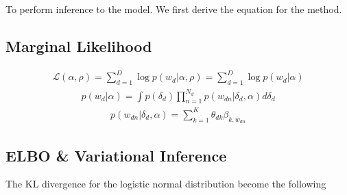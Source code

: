 To perform inference to the model. We first derive the equation for the method.
\subsection{Marginal Likelihood}
\begin{align*}
\mathcal{L}(\alpha,\rho)=\sum_{d=1}^{D}\log p(w_d|\alpha,\rho)=\sum_{d=1}^{D}\log p(w_d|\alpha)
\end{align*}
\begin{align*}
p(w_d|\alpha)=\int p(\delta_d)\prod_{n=1}^{N_d}p(w_{dn}|\delta_d,\alpha)d\delta_d
\end{align*}
\begin{align*}
p(w_{dn}|\delta_d,\alpha)=\sum_{k=1}^{K}\theta_{dk}\beta_{k,w_{dn}}
\end{align*}
\subsection{ELBO \& Variational Inference}
The KL divergence for the logistic normal distribution become the following
